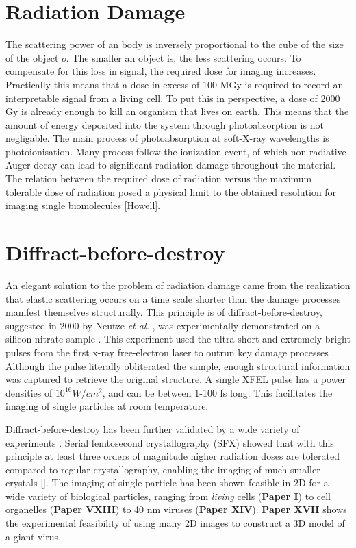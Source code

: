 \section{Radiation Damage}
The scattering power of an body is inversely proportional to the cube of the size of the object $o$. The smaller an object is, the less scattering occurs. To compensate for this loss in signal, the required dose for imaging increases. Practically this means that a dose in excess of 100 MGy is required to record an interpretable signal from a living cell. To put this in perspective, a dose of 2000 Gy is already enough to kill an organism that lives on earth. This means that the amount of energy deposited into the system through photoabsorption is not negligable. The main process of photoabsorption at soft-X-ray wavelengths is  photoionisation. Many process follow the ionization event, of which non-radiative Auger decay can lead to significant radiation damage throughout the material. The relation between the required dose of radiation versus the maximum tolerable dose of radiation posed a physical limit to the obtained resolution for imaging single biomolecules [Howell].

\section{Diffract-before-destroy}
An elegant solution to the problem of radiation damage came from the realization that elastic scattering occurs on a  time scale shorter than the damage processes manifest themselves structurally. This principle is of diffract-before-destroy, suggested in 2000 by Neutze \textit{et al.} \cite{Neutze2000}, was experimentally demonstrated on a silicon-nitrate sample \cite{Chapman2009}. This experiment used the ultra short and extremely bright pulses from the first x-ray free-electron laser to outrun key damage processes \cite{Chapman2000}. Although the pulse literally obliterated the sample, enough structural information was captured to retrieve the original structure. A single XFEL pulse has a power densities of $10^{16} W/cm^2$, and can be between 1-100 fs long. This facilitates the imaging of single particles at room temperature.

Diffract-before-destroy has been further validated by a wide variety of experiments \cite{Seibert2009,Seibert2010}. Serial femtosecond crystallography (SFX) showed that with this principle at least three orders of magnitude higher radiation doses are tolerated compared to regular crystallography, enabling the imaging of much smaller crystals []. The imaging of single particle has been shown feasible in 2D for a wide variety of biological particles, ranging from \textit{living} cells (\textbf{Paper I}) to cell organelles (\textbf{Paper VXIII}) to  40 nm viruses (\textbf{Paper XIV}). \textbf{Paper XVII} shows the experimental feasibility of using many 2D images to construct a 3D model of a giant virus.

